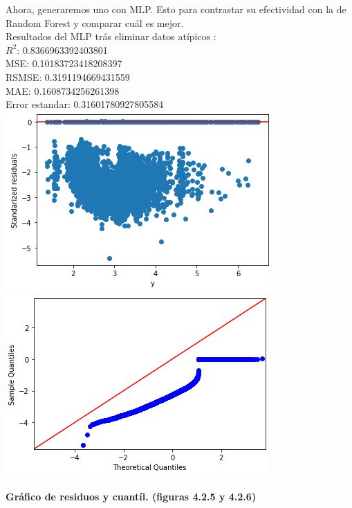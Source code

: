 \documentclass{article}
\begin{document}
        Ahora, generaremos uno con MLP. Esto para contrastar su efectividad con la de Random Forest y comparar cuál es mejor.\\
        
        Resultados del MLP trás eliminar datos atípicos
        :\\
        
                $R^2$:  0.8366963392403801\\
                MSE:  0.10183723418208397\\
                RSMSE:  0.3191194669431559\\
                MAE:  0.1608734256261398\\
                Error estandar:  0.31601780927805584\\
        
                \includegraphics[scale=0.6]{images/residuos-stage-MLP-2.PNG} 
                \includegraphics[scale=0.6]{images/residuos-stage-MLP-quantil.PNG} \\
                        \begin{center}
                    \textbf{Gráfico de residuos y cuantíl. (figuras 4.2.5 y 4.2.6)}
                \end{center}
        
\end{document}
